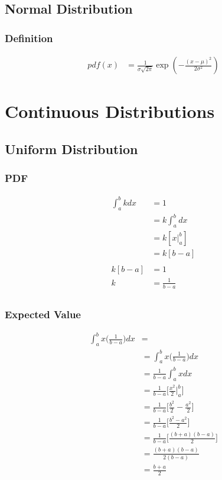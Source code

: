 \documentclass[]{article}
\begin{document}
\section {Normal Distribution}

\subsection {Definition}

\begin{align}
pdf(x) &= \frac{1}{\sigma\sqrt{2\pi}}\exp\left(-\frac{(x-\mu)^2}{2\sigma^2}\right)
\end{align}

\chapter {Continuous Distributions}

\section{Uniform Distribution}

\subsection{PDF}
\begin{align*}
\int_{a}^{b} {kdx} &= 1\\
&= k\int_{a}^{b} {dx}\\
&= k[x|_{a}^{b}]\\
&= k[b-a]\\	
\\
k[b-a] &= 1\\
k &= \frac{1} {b-a}\\
\end{align*}

\subsection{Expected Value}
\begin{align*}
\int_{a}^{b} {x\big( \frac{1}{b-a} \big)dx} &= \\
&= \int_{a}^{b} {x\big( \frac{1}{b-a} \big)dx}\\
&= \frac{1}{b-a}\int_{a}^{b} {xdx}\\
&= \frac{1}{b-a}\big[ \frac{x^2}{2}|_{a}^{b} \big]\\
&= \frac{1}{b-a}\big[ \frac{b^2}{2} - \frac{a^2}{2} \big]\\
&= \frac{1}{b-a}\big[ \frac{b^2-a^2}{2} \big]\\
&= \frac{1}{b-a}\big[ \frac{(b+a)(b-a)}{2} \big]\\
&= \frac{(b+a)(b-a)}{2(b-a)}\\
&= \frac{b+a}{2}\\
\end{align*}
\end{document}
